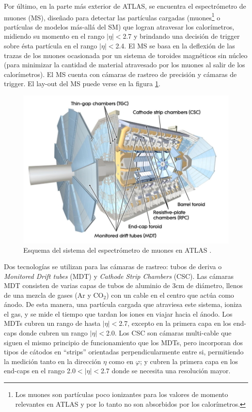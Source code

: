 Por último, en la parte más exterior de ATLAS, se encuentra el espectrómetro de muones (MS), diseñado para detectar las partículas cargadas (muones\footnote{Los muones son partículas poco ionizantes para los valores de momento relevantes en ATLAS y por lo tanto no son absorbidos por los calorímetros.} o partículas de modelos más-allá del SM) que logran atravesar los calorímetros, midiendo su momento en el rango $|\eta|<$2.7 y brindando una decisión de trigger sobre ésta partícula en el rango $|\eta|<$2.4. El MS se basa en la deflexión de las trazas de los muones ocasionada por un sistema de toroides magnéticos sin núcleo (para minimizar la cantidad de material atravesado por los muones al salir de los calorímetros).
El MS cuenta con cámaras de rastreo de precisión y cámaras de trigger. El lay-out del MS puede verse en la figura \ref{fig:MS}.
\begin{figure}[h]
    \centering
    \includegraphics[width =0.7\linewidth]{images/MS}
    \caption{Esquema del sistema del espectrómetro de muones en ATLAS \cite{MS}.}
    \label{fig:MS}
\end{figure}

Dos tecnologías se utilizan para las cámaras de rastreo: tubos de deriva o \textit{Monitored Drift tubes} (MDT) y \textit{Cathode Strip Chambers} (CSC). Las cámaras MDT consisten de varias capas de tubos de aluminio de 3cm de diámetro, llenos de una mezcla de gases (Ar y CO$_2$) con un cable en el centro que actúa como ánodo. De esta manera, una partícula cargada que atraviesa este sistema, ioniza el gas, y se mide el tiempo que tardan los iones en viajar hacia el ánodo. Los MDTs cubren un rango de hasta $|\eta|<$2.7, excepto en la primera capa en los end-caps donde cubren un rango $|\eta|<$2.0. Los CSC son cámaras multi-cable que siguen el mismo principio de funcionamiento que los MDTs, pero incorporan dos tipos de cátodos en ``strips'' orientadas perpendicularmente entre si, permitiendo la medición tanto en la dirección $\eta$ como en $\varphi$; y cubren la primera capa en los end-caps en el rango 2.0$<|\eta|<$2.7 donde se necesita una resolución mayor. 

